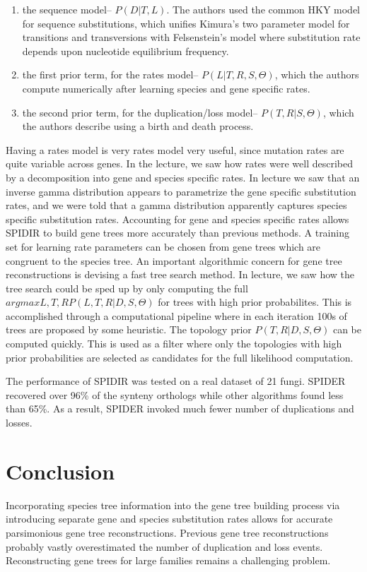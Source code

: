 \begin{enumerate} 
\item the sequence model-- $P(D|T,L)$. The authors used the common HKY
  model for sequence substitutions, which unifies Kimura's two
  parameter model for transitions and transversions with Felsenstein's
  model where substitution rate depends upon nucleotide equilibrium
  frequency.
\item the first prior term, for the rates model-- $P(L|T,R,S,\Theta)$,
  which the authors compute numerically after learning species and
  gene specific rates.
\item the second prior term, for the duplication/loss model--
  $P(T,R|S,\Theta)$, which the authors describe using a birth and
  death process.
\end{enumerate} 

Having a rates model is very rates model very useful, since mutation
rates are quite variable across genes. In the lecture, we saw how
rates were well described by a decomposition into gene and species
specific rates. In lecture we saw that an inverse gamma distribution
appears to parametrize the gene specific substitution rates, and we
were told that a gamma distribution apparently captures species
specific substitution rates. Accounting for gene and species specific
rates allows SPIDIR to build gene trees more accurately than previous
methods. A training set for learning rate parameters can be chosen
from gene trees which are congruent to the species tree. An important
algorithmic concern for gene tree reconstructions is devising a fast
tree search method. In lecture, we saw how the tree search could be
sped up by only computing the full $argmax L,T,R P(L,T,R|D,S,\Theta)$
for trees with high prior probabilites. This is accomplished through a
computational pipeline where in each iteration 100s of trees are
proposed by some heuristic. The topology prior $P(T,R|D,S,\Theta)$ can
be computed quickly. This is used as a filter where only the
topologies with high prior probabilities are selected as candidates
for the full likelihood computation.

\noindent The performance of SPIDIR was tested on a real dataset of 21
fungi. SPIDER recovered over 96\% of the synteny orthologs while other
algorithms found less than 65\%. As a result, SPIDER invoked much
fewer number of duplications and losses.

\section{Conclusion} 
Incorporating species tree information into the gene tree building
process via introducing separate gene and species substitution rates
allows for accurate parsimonious gene tree reconstructions. Previous
gene tree reconstructions probably vastly overestimated the number of
duplication and loss events. Reconstructing gene trees for large
families remains a challenging problem.

